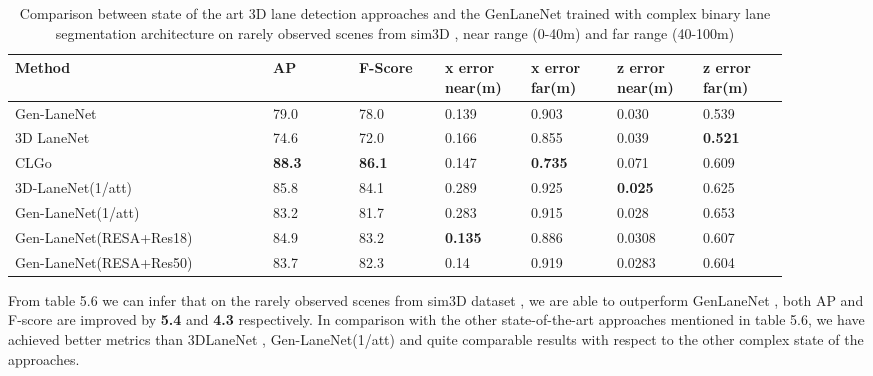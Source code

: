         \begin{table}[htbp]
    \centering
    \caption{Comparison between state of the art 3D lane detection approaches and the GenLaneNet \cite{Guo_2018_ECCV} trained with complex binary lane segmentation architecture on rarely observed scenes from sim3D \cite{guo2020gen}, near range (0-40m) and far range (40-100m) \cite{guo2020gen}}
    \begin{tabular}{|p{0.3\linewidth}|p{0.1\linewidth}|p{0.1\linewidth}|p{0.1\linewidth}|p{0.1\linewidth}|p{0.1\linewidth}|p{0.1\linewidth}|}
    \hline
        \textbf{Method} & \textbf{AP} & \textbf{F-Score} & \textbf{x error near(m)} & \textbf{x error far(m)} & \textbf{z error near(m)} & \textbf{z error far(m)} \\ \hline
        Gen-LaneNet\cite{guo2020gen} & 79.0 & 78.0 & 0.139 & 0.903 & 0.030 & 0.539 \\ \hline
        3D LaneNet\cite{DBLP:journals/corr/abs-1811-10203} & 74.6 & 72.0 & 0.166 & 0.855 & 0.039 &\textbf{ 0.521} \\ \hline
        CLGo\cite{DBLP:journals/corr/abs-2112-15351} &\textbf{ 88.3} &\textbf{ 86.1} & 0.147 & \textbf{0.735} & 0.071 & 0.609 \\ \hline
        3D-LaneNet(1/att)\cite{9506296} & 85.8 & 84.1 & 0.289 & 0.925 &\textbf{ 0.025} & 0.625 \\ \hline
        Gen-LaneNet(1/att)\cite{9506296} & 83.2 & 81.7 & 0.283 & 0.915 & 0.028 & 0.653 \\ \hline
        Gen-LaneNet(RESA+Res18) &  84.9 & 83.2 &\textbf{ 0.135} & 0.886 & 0.0308 & 0.607 \\ \hline
        Gen-LaneNet(RESA+Res50) & 83.7 & 82.3 & 0.14 & 0.919 & 0.0283 & 0.604 \\ \hline
    \end{tabular}
\end{table}
    
     From table 5.6 we can infer that on the rarely observed scenes from sim3D dataset \cite{guo2020gen}, we are able to outperform GenLaneNet \cite{guo2020gen}, both AP and F-score are improved by \textbf{5.4} and \textbf{4.3} respectively. In comparison with the other state-of-the-art approaches mentioned in table 5.6, we have achieved better metrics than 3DLaneNet \cite{DBLP:journals/corr/abs-1811-10203}, Gen-LaneNet(1/att) \cite{9506296} and quite comparable results with respect to the other complex state of the approaches. 
    
